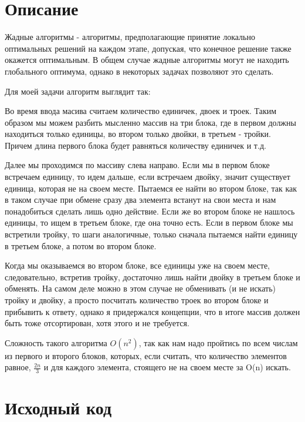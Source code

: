 \section{Описание}

Жадные алгоритмы - алгоритмы, предполагающие принятие локально оптимальных решений на каждом этапе, допуская, что конечное решение также окажется оптимальным. В общем случае жадные алгоритмы могут не находить глобального оптимума, однако в некоторых задачах позволяют это сделать.

Для моей задачи алгоритм выглядит так:

Во время ввода масива считаем количество единичек, двоек и троек. Таким образом мы можем разбить мысленно массив на три блока, где в первом должны находиться только единицы, во втором только двойки, в третьем - тройки. Причем длина первого блока будет равняться количеству единичек и т.д. 

Далее мы проходимся по массиву слева направо. Если мы в первом блоке встречаем единицу, то идем дальше, если встречаем двойку, значит существует единица, которая не на своем месте. Пытаемся ее найти во втором блоке, так как в таком случае при обмене сразу два элемента встанут на свои места и нам понадобиться сделать лишь одно действие. Если же во втором блоке не нашлось единицы, то ищем в третьем блоке, где она точно есть. Если в первом блоке мы встретили тройку, то шаги аналогичные, только сначала пытаемся найти единицу в третьем блоке, а потом во втором блоке. 

Когда мы оказываемся во втором блоке, все единицы уже на своем месте, следовательно, встретив тройку, достаточно лишь найти двойку в третьем блоке и обменять. На самом деле можно в этом случае не обменивать (и не искать) тройку и двойку, а просто посчитать количество троек во втором блоке и прибывить к ответу, однако я придержался концепции, что в итоге массив должен быть тоже отсортирован, хотя этого и не требуется.

Сложность такого алгоритма $O(n^{2})$, так как нам надо пройтись по всем числам из первого и второго блоков, которых, если считать, что количество элементов равное, $\frac{2n}{3}$ и для каждого элемента, стоящего не на своем месте за O(n) искать.
\newpage

\section{Исходный код}

